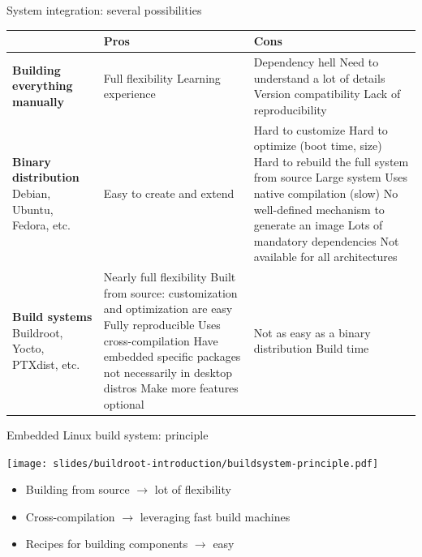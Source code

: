 \begin{frame}{System integration: several possibilities}
  \tiny
  \begin{tabularx}{11cm}{|X|X|X|}
    \hline
    & {\bf Pros} & {\bf Cons} \\
    \hline
    {\bf Building everything manually} &
    Full flexibility \newline
    Learning experience &
    Dependency hell \newline
    Need to understand a lot of details \newline
    Version compatibility \newline
    Lack of reproducibility \\
    \hline
    {\bf Binary distribution} \newline Debian, Ubuntu, Fedora, etc.
    &
    Easy to create and extend
    &
    Hard to customize \newline
    Hard to optimize (boot time, size) \newline
    Hard to rebuild the full system from source \newline
    Large system \newline
    Uses native compilation (slow) \newline
    No well-defined mechanism to generate an image \newline
    Lots of mandatory dependencies \newline
    Not available for all architectures \\
    \hline
    {\bf Build systems} \newline Buildroot, Yocto, PTXdist, etc.
    &
    Nearly full flexibility \newline
    Built from source: customization and optimization are easy \newline
    Fully reproducible \newline
    Uses cross-compilation \newline
    Have embedded specific packages not necessarily in desktop distros \newline
    Make more features optional
    &
    Not as easy as a binary distribution \newline
    Build time \\
    \hline
  \end{tabularx}
\end{frame}

\begin{frame}{Embedded Linux build system: principle}
  \begin{center}
    \texttt{[image: slides/buildroot-introduction/buildsystem-principle.pdf]}
  \end{center}
  \begin{itemize}
  \item Building from source $\rightarrow$ lot of flexibility
  \item Cross-compilation $\rightarrow$ leveraging fast build machines
  \item Recipes for building components $\rightarrow$ easy
  \end{itemize}
\end{frame}

